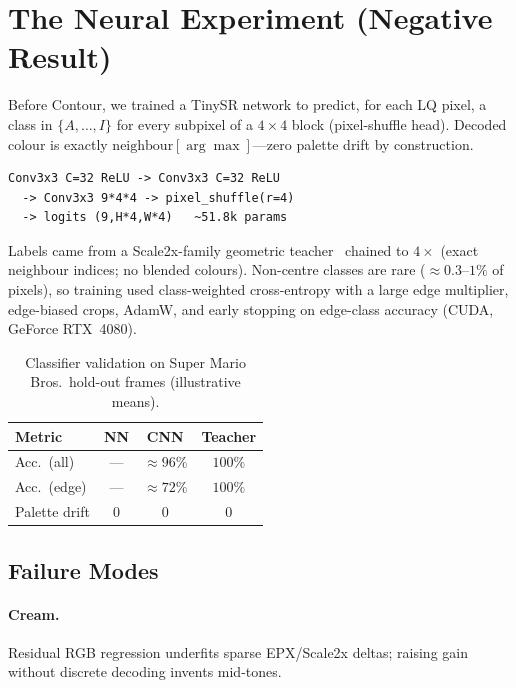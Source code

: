 \documentclass[conference]{IEEEtran}
\begin{document}
\section{The Neural Experiment (Negative Result)}
\label{sec:neural}

Before Contour, we trained a TinySR network to predict, for each LQ pixel, a
class in $\{A,\ldots,I\}$ for every subpixel of a $4{\times}4$ block
(pixel-shuffle head). Decoded colour is exactly
$\mathrm{neighbour}[\arg\max]$---zero palette drift by construction.
\begin{lstlisting}
Conv3x3 C=32 ReLU -> Conv3x3 C=32 ReLU
  -> Conv3x3 9*4*4 -> pixel_shuffle(r=4)
  -> logits (9,H*4,W*4)   ~51.8k params
\end{lstlisting}
Labels came from a Scale2x-family geometric teacher~\cite{mazzoleni2001scale2x}
chained to $4{\times}$ (exact neighbour indices; no blended colours).
Non-centre classes are rare ($\approx\!0.3$--$1\%$ of pixels), so training used
class-weighted cross-entropy with a large edge multiplier, edge-biased crops,
AdamW, and early stopping on edge-class accuracy (CUDA, GeForce RTX~4080).

\begin{table}[t]
  \caption{Classifier validation on Super Mario Bros.\ hold-out frames
  (illustrative means).}
  \label{tab:cnn}
  \centering
  \renewcommand{\arraystretch}{1.15}
  \begin{tabular}{@{}lccc@{}}
    \toprule
    \textbf{Metric} & \textbf{NN} & \textbf{CNN} & \textbf{Teacher} \\
    \midrule
    Acc.\ (all)  & --- & $\approx 96\%$ & $100\%$ \\
    Acc.\ (edge) & --- & $\approx 72\%$ & $100\%$ \\
    Palette drift & $0$ & $0$ & $0$ \\
    \bottomrule
  \end{tabular}
\end{table}

\subsection{Failure Modes}
\paragraph{Cream.}
Residual RGB regression underfits sparse EPX/Scale2x deltas; raising gain without
discrete decoding invents mid-tones.
\end{document}
